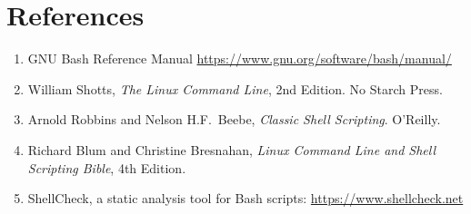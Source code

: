 \section{References}
\label{sec:references-bash-prog}

\begin{enumerate}
  \item GNU Bash Reference Manual \url{https://www.gnu.org/software/bash/manual/}
  \item William Shotts, \textit{The Linux Command Line}, 2nd Edition. No Starch Press.
  \item Arnold Robbins and Nelson H.F.\ Beebe, \textit{Classic Shell Scripting}. O'Reilly.
  \item Richard Blum and Christine Bresnahan, \textit{Linux Command Line and Shell Scripting Bible}, 4th Edition.
  \item ShellCheck, a static analysis tool for Bash scripts: \url{https://www.shellcheck.net}
\end{enumerate}

